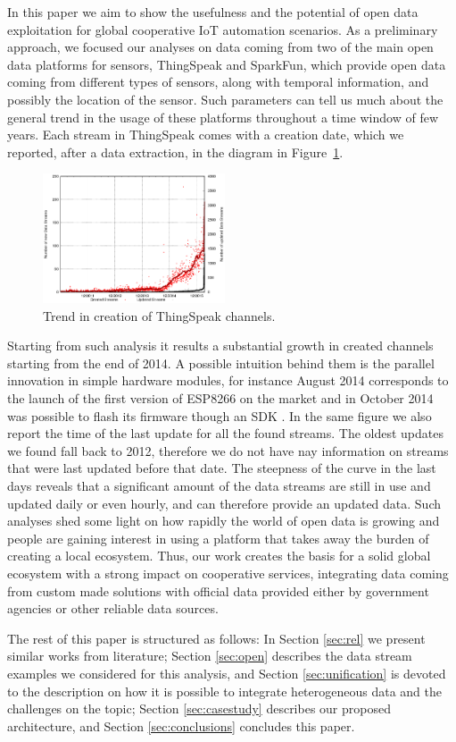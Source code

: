 In this paper we aim to show the usefulness and the potential of open data exploitation for global cooperative IoT automation scenarios.
As a preliminary approach, we focused our analyses on data coming from two of the main open data platforms for sensors, ThingSpeak and SparkFun, which provide open data coming from different types of sensors, along with temporal information, and possibly the location of the sensor.
Such parameters can tell us much about the general trend in the usage of these platforms throughout a time window of few years.
Each stream in ThingSpeak comes with a creation date, which we reported, after a data extraction, in the diagram in Figure~\ref{creationtrend}.
\begin{figure}[btp]
\centering
\includegraphics[width=0.48\textwidth]{img/bars.eps} 
\caption{Trend in creation of ThingSpeak channels.}
\label{creationtrend}
\end{figure}
Starting from such analysis it results a substantial growth in created channels starting from the end of 2014. 
A possible intuition behind them is the parallel innovation in simple hardware modules, for instance August 2014 corresponds to the launch of the first version of ESP8266 \cite{esp8266} on the market and in October 2014 was possible to flash its firmware though an SDK \cite{espressif}.
In the same figure we also report the time of the last update for all the found streams.
The oldest updates we found fall back to 2012, therefore we do not have nay information on streams that were last updated before that date.
The steepness of the curve in the last days reveals that a significant amount of the data streams are still in use and updated daily or even hourly, and can therefore provide an updated data. Such analyses shed some light on how rapidly the world of open data is growing and people are gaining interest in using a platform that takes away the burden of creating a local ecosystem.
Thus, our work creates the basis for a solid global ecosystem with a strong impact on cooperative services, integrating data coming from custom made solutions with official data provided either by government agencies or other reliable data sources. 

The rest of this paper is structured as follows: In Section \ref{sec:rel} we present similar works from literature; Section \ref{sec:open} describes the data stream examples we considered for this analysis, and Section \ref{sec:unification} is devoted to the description on how it is possible to integrate heterogeneous data and the challenges on the topic; Section \ref{sec:casestudy} describes our proposed architecture, and Section \ref{sec:conclusions} concludes this paper.
